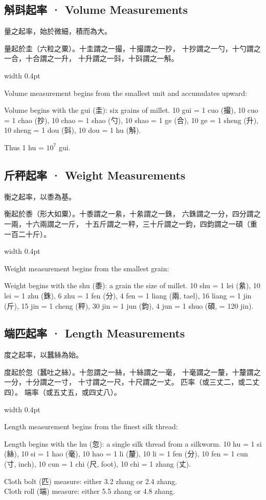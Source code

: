 \documentclass[10pt,a4paper]{article}
\newlength{\cnwidth}
\newlength{\enwidth}
\newcommand{\bilingual}[2]{%
  \noindent%
  \begin{minipage}[t]{\cnwidth}%
    #1%
  \end{minipage}%
  \hfill\vrule width 0.4pt\hfill%
  \begin{minipage}[t]{\enwidth}%
    #2%
  \end{minipage}%
  \par\smallskip%
}
\newcommand{\bilingualsubsection}[2]{%
  \subsection*{#1 · #2}
}
\begin{document}
\bilingualsubsection{斛㪷起率}{Volume Measurements}

\bilingual{%
  量之起率，始於微細，積而為大。

  量起於圭（六粒之粟）。十圭謂之一撮，十撮謂之一抄，
  十抄謂之一勺，十勺謂之一合，十合謂之一升，
  十升謂之一㪷，十㪷謂之一斛。
}{%
  Volume measurement begins from the smallest unit and accumulates upward:

  Volume begins with the gui (圭): six grains of millet.
  10 gui = 1 cuo (撮), 10 cuo = 1 chao (抄),
  10 chao = 1 shao (勺), 10 shao = 1 ge (合),
  10 ge = 1 sheng (升), 10 sheng = 1 dou (㪷),
  10 dou = 1 hu (斛).

  Thus 1 hu = $10^7$ gui.
}

\bilingualsubsection{斤秤起率}{Weight Measurements}

\bilingual{%
  衡之起率，以黍為基。

  衡起於黍（形大如粟）。十黍謂之一絫，十絫謂之一銖，
  六銖謂之一分，四分謂之一兩，十六兩謂之一斤，
  十五斤謂之一秤，三十斤謂之一鈞，四鈞謂之一碩（重一百二十斤）。
}{%
  Weight measurement begins from the smallest grain:

  Weight begins with the shu (黍): a grain the size of millet.
  10 shu = 1 lei (絫), 10 lei = 1 zhu (銖),
  6 zhu = 1 fen (分), 4 fen = 1 liang (兩, tael),
  16 liang = 1 jin (斤), 15 jin = 1 cheng (秤),
  30 jin = 1 jun (鈞), 4 jun = 1 shuo (碩, = 120 jin).
}

\bilingualsubsection{端匹起率}{Length Measurements}

\bilingual{%
  度之起率，以蠶絲為始。

  度起於忽（蠶吐之絲）。十忽謂之一絲，十絲謂之一毫，
  十毫謂之一釐，十釐謂之一分，十分謂之一寸，
  十寸謂之一尺，十尺謂之一丈。
  匹率（或三丈二，或二丈四）。
  端率（或五丈五，或四丈八）。
}{%
  Length measurement begins from the finest silk thread:

  Length begins with the hu (忽): a single silk thread from a silkworm.
  10 hu = 1 si (絲), 10 si = 1 hao (毫),
  10 hao = 1 li (釐), 10 li = 1 fen (分),
  10 fen = 1 cun (寸, inch), 10 cun = 1 chi (尺, foot),
  10 chi = 1 zhang (丈).

  Cloth bolt (匹) measure: either 3.2 zhang or 2.4 zhang.\\
  Cloth roll (端) measure: either 5.5 zhang or 4.8 zhang.
}
\end{document}

